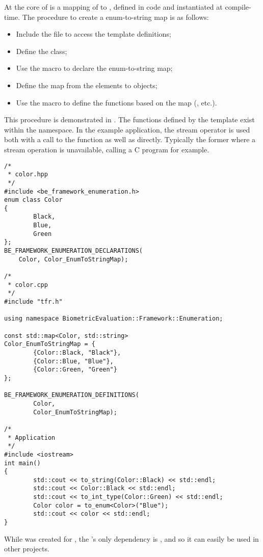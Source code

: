 At the core of  is a  mapping of
 to , defined in code and instantiated at
compile-time. The procedure to create a enum-to-string map is as follows:
\begin{itemize}
\item Include the  file to access the
template definitions;
\item Define the  class;
\item Use the  macro to declare
the enum-to-string map;
\item Define the map from the  elements to  objects;
\item Use the  macro to define the
functions based on the map (, etc.).
\end{itemize}

This procedure is demonstrated in .
The functions defined by the template exist within the 
 namespace. In the
example application, the stream operator is used both with a call to the
 function as well as directly. Typically the former where a
stream operation is unavailable, calling a C program for example.

\begin{lstlisting}[caption={\namespace{Framework::Enumeration}}, label=framework-enumeration]
/*
 * color.hpp
 */
#include <be_framework_enumeration.h>
enum class Color
{
        Black,
        Blue,
        Green
};
BE_FRAMEWORK_ENUMERATION_DECLARATIONS(
    Color, Color_EnumToStringMap);

/*
 * color.cpp
 */
#include "tfr.h"

using namespace BiometricEvaluation::Framework::Enumeration;
        
const std::map<Color, std::string>
Color_EnumToStringMap = {
        {Color::Black, "Black"},
        {Color::Blue, "Blue"},
        {Color::Green, "Green"}
};

BE_FRAMEWORK_ENUMERATION_DEFINITIONS(
        Color,
        Color_EnumToStringMap);

/*
 * Application
 */
#include <iostream>
int main()
{
        std::cout << to_string(Color::Black) << std::endl;
        std::cout << Color::Black << std::endl;
        std::cout << to_int_type(Color::Green) << std::endl;
        Color color = to_enum<Color>("Blue");
        std::cout << color << std::endl;
}
\end{lstlisting}

While  was created for \sname, the
's only dependency is , and so it can easily be
used in other \CppXI projects.
